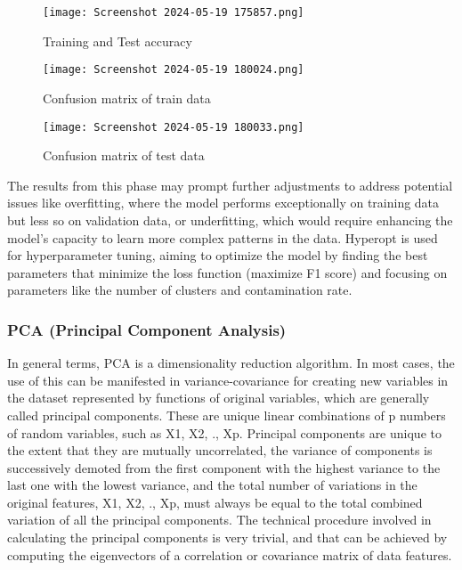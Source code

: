 \documentclass[journal]{IEEEtran}
\begin{document}
\begin{figure}
    \centering
    \texttt{[image: Screenshot 2024-05-19 175857.png]}
    \caption{Training and Test accuracy}
    \label{fig:enter-label}
\end{figure}
\begin{figure}
    \centering
    \texttt{[image: Screenshot 2024-05-19 180024.png]}
    \caption{Confusion matrix of train data}
    \label{fig:enter-label}
\end{figure}
\begin{figure}
    \centering
    \texttt{[image: Screenshot 2024-05-19 180033.png]}
    \caption{Confusion matrix of test data}
    \label{fig:enter-label}
    
\end{figure}
The results from this phase may prompt further adjustments to address potential issues like overfitting, where the model performs exceptionally on training data but less so on validation data, or underfitting, which would require enhancing the model’s capacity to learn more complex patterns in the data. Hyperopt is used for hyperparameter tuning, aiming to optimize the model by finding the best parameters that minimize the loss function (maximize F1 score) and focusing on parameters like the number of clusters and contamination rate.

\subsubsection{ PCA (Principal Component Analysis)}
In general terms, PCA is a dimensionality reduction algorithm. In most cases, the use of this can be manifested in variance-covariance for creating new variables in the dataset represented by functions of original variables, which are generally called principal components. These are unique linear combinations of p numbers of random variables, such as X1, X2, ., Xp. Principal components are unique to the extent that they are mutually uncorrelated, the variance of components is successively demoted from the first component with the highest variance to the last one with the lowest variance, and the total number of variations in the original features, X1, X2, ., Xp, must always be equal to the total combined variation of all the principal components. The technical procedure involved in calculating the principal components is very trivial, and that can be achieved by computing the eigenvectors of a correlation or covariance matrix of data features.
\end{document}
